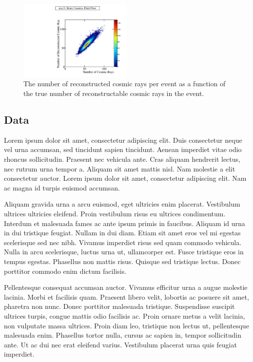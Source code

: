 \begin{figure}
\includegraphics[width=0.5\textwidth]{Figures/Metrics/MC/Cosmics/CRMatchesCosmicRayEvent.pdf}
\caption{The number of reconstructed cosmic rays per event as a function of the true number of reconstructable cosmic rays in the event.}
\label{fig:6}
\end{figure}

\subsection{Data}

Lorem ipsum dolor sit amet, consectetur adipiscing elit. Duis consectetur neque vel urna accumsan, sed tincidunt sapien tincidunt. Aenean imperdiet vitae odio rhoncus sollicitudin. Praesent nec vehicula ante. Cras aliquam hendrerit lectus, nec rutrum urna tempor a. Aliquam sit amet mattis nisl. Nam molestie a elit consectetur auctor. Lorem ipsum dolor sit amet, consectetur adipiscing elit. Nam ac magna id turpis euismod accumsan.

Aliquam gravida urna a arcu euismod, eget ultricies enim placerat. Vestibulum ultrices ultricies eleifend. Proin vestibulum risus eu ultrices condimentum. Interdum et malesuada fames ac ante ipsum primis in faucibus. Aliquam id urna in dui tristique feugiat. Nullam in dui diam. Etiam sit amet eros vel mi egestas scelerisque sed nec nibh. Vivamus imperdiet risus sed quam commodo vehicula. Nulla in arcu scelerisque, luctus urna ut, ullamcorper est. Fusce tristique eros in tempus egestas. Phasellus non mattis risus. Quisque sed tristique lectus. Donec porttitor commodo enim dictum facilisis.

Pellentesque consequat accumsan auctor. Vivamus efficitur urna a augue molestie lacinia. Morbi et facilisis quam. Praesent libero velit, lobortis ac posuere sit amet, pharetra non nunc. Donec porttitor malesuada tristique. Suspendisse suscipit ultrices turpis, congue mattis odio facilisis ac. Proin ornare metus a velit lacinia, non vulputate massa ultrices. Proin diam leo, tristique non lectus ut, pellentesque malesuada enim. Phasellus tortor nulla, cursus ac sapien in, tempor sollicitudin ante. Ut ac dui nec erat eleifend varius. Vestibulum placerat urna quis feugiat imperdiet.


